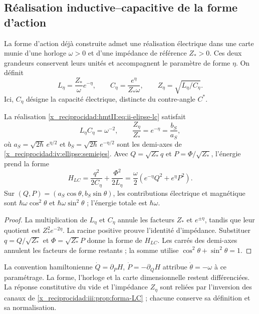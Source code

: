 \subsection{Réalisation inductive--capacitive de la forme d’action}
\label{x_reciprocidad:nuclear:realizacion-lc}

La forme d’action déjà construite admet une réalisation électrique dans
une carte munie d’une horloge \(\omega>0\) et d’une impédance de
référence \(Z_*>0\). Ces deux grandeurs conservent leurs unités et
accompagnent le paramètre de forme \(\eta\). On définit
\begin{equation}
 L_\eta=\frac{Z_*}{\omega}e^{-\eta},\qquad
 C_\eta=\frac{e^\eta}{Z_*\omega},\qquad
 Z_\eta=\sqrt{L_\eta/C_\eta}.
 \label{x_reciprocidad:hmtII:eq:ii-elipse-lc}
\end{equation}
Ici, \(C_\eta\) désigne la capacité électrique, distincte du contre-angle \(C^*\).

\begin{proposition}
\label{x_reciprocidad:nuclear:lc-producto}
La réalisation \eqref{x_reciprocidad:hmtII:eq:ii-elipse-lc} satisfait
\begin{equation}
 L_\eta C_\eta=\omega^{-2},\qquad
 \frac{Z_\eta}{Z_*}=e^{-\eta}=\frac{b_S}{a_S},
 \label{x_reciprocidad:hmtII:eq:ii-elipse-impedancia}
\end{equation}
où \(a_S=\sqrt{2\hbar}\,e^{\eta/2}\) et
\(b_S=\sqrt{2\hbar}\,e^{-\eta/2}\) sont les demi-axes de
\cref{x_reciprocidad:iv:ellipse:semiejes}.
Avec \(Q=\sqrt{Z_*}q\) et \(P=\Phi/\sqrt{Z_*}\), l’énergie prend la forme
\[
 H_{LC}=\frac{q^2}{2C_\eta}+\frac{\Phi^2}{2L_\eta}
       =\frac\omega2(e^{-\eta}Q^2+e^\eta P^2).
\]
Sur \((Q,P)=(a_S\cos\theta,b_S\sin\theta)\), les contributions
électrique et magnétique sont \(\hbar\omega\cos^2\theta\) et
\(\hbar\omega\sin^2\theta\) ; l’énergie totale est \(\hbar\omega\).
\end{proposition}
\begin{proof}
La multiplication de \(L_\eta\) et \(C_\eta\) annule les facteurs
\(Z_*\) et \(e^{\pm\eta}\), tandis que leur quotient est
\(Z_*^2e^{-2\eta}\). La racine positive prouve l’identité d’impédance.
Substituer \(q=Q/\sqrt{Z_*}\) et \(\Phi=\sqrt{Z_*}P\) donne la forme
de \(H_{LC}\). Les carrés des demi-axes annulent les facteurs
de forme restants ; la somme utilise \(\cos^2\theta+\sin^2\theta=1\).
\end{proof}

La convention hamiltonienne
\(\dot Q=\partial_PH\), \(\dot P=-\partial_QH\) attribue
\(\dot\theta=-\omega\) à ce paramétrage. La forme, l’horloge
et la carte dimensionnelle restent différenciées. La réponse
constitutive du vide et l’impédance \(Z_\eta\) sont reliées
par l’inversion des canaux de \cref{x_reciprocidad:iii:prop:forma-LC} ; chacune
conserve sa définition et sa normalisation.

